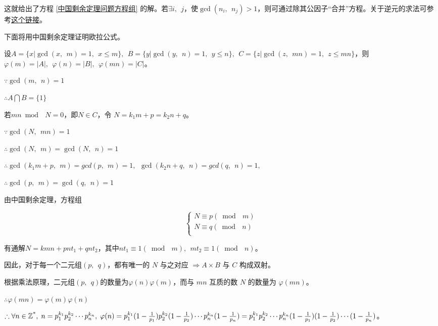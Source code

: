 \documentclass[a4paper]{article}         %
\begin{document}
这就给出了方程 \ref{中国剩余定理问题方程组} 的解。若$\exists i, \phantom{;} j$，使$\gcd(n_i, \phantom{;} n_j) > 1$，则可通过除其公因子“合并”方程。关于逆元的求法可参考\href{https://blog.csdn.net/xiaoming_p/article/details/79644386}{这个链接}。

下面将用中国剩余定理证明欧拉公式。

设$A = \{ x \vert \gcd(x, \phantom{;} m) = 1, \phantom{;} x \leqslant m \}, \phantom{;} B = \{ y \vert \gcd(y, \phantom{;} n) = 1, \phantom{;} y \leqslant n \}, \phantom{;} C = \{ z \vert \gcd(z, \phantom{;} mn) = 1, \phantom{;} z \leqslant mn \}$，则 $\varphi(m) = \left\lvert A\right\rvert, \phantom{;}\varphi(n) = \left\lvert B\right\rvert, \phantom{;}\varphi(mn) = \left\lvert C\right\rvert$。

$\because \gcd(m, \phantom{;} n) = 1$

$\therefore A \bigcap B = \{ 1 \}$

若$mn \bmod \phantom{;} N = 0$，即$N \in C$，令 $N = k_1m + p = k_2n + q$。

$\because \gcd(N, \phantom{;} mn) = 1$

$\therefore \gcd(N, \phantom{;} m) = \gcd(N, \phantom{;} n) = 1$

$\therefore \gcd(k_1m + p, \phantom{;} m) = gcd(p, \phantom{;} m) = 1, \phantom{;} \gcd(k_2n + q, \phantom{;} n) = gcd(q, \phantom{;} n) = 1, \phantom{;}$

$\therefore \gcd(p, \phantom{;} m) = \gcd(q, \phantom{;} n) = 1$

由中国剩余定理，方程组

\[
	\begin{cases}
		N \equiv p(\bmod \phantom{;} m) \\
		N \equiv q(\bmod \phantom{;} n) \\
	\end{cases}
\]

有通解$N = kmn + pnt_1 + qnt_2$，其中$nt_1 \equiv 1(\bmod \phantom{;} m), \phantom{;} mt_2 \equiv 1 (\bmod \phantom{;} n)$。

因此，对于每一个二元组$(p, \phantom{;} q)$，都有唯一的 $N$ 与之对应 $\Rightarrow A \times B$ 与 $C$ 构成双射。

根据乘法原理，二元组$(p, \phantom{;} q)$的数量为$\varphi(n) \varphi(m)$，而与 $mn$ 互质的数 $N$ 的数量为 $\varphi(mn)$。

$\therefore \varphi(mn) = \varphi(m) \varphi(n)$

$\therefore \forall n \in \mathbb{Z\textsuperscript{*}}, \phantom{;} n = p_1^{k_1}p_2^{k_2} \cdots p_n^{k_n}, \phantom{;} \varphi(n) = p_1^{k_1}(1 - \frac{1}{p_1})p_2^{k_2}(1 - \frac{1}{p_2})\cdots p_n^{k_n}(1 - \frac{1}{p_n})=p_1^{k_1}p_2^{k_2}\cdots p_n^{k_n}(1 - \frac{1}{p_1})(1 - \frac{1}{p_2})\cdots (1 - \frac{1}{p_n})$。
\end{document}
